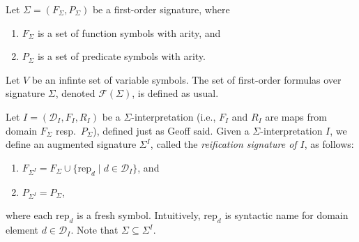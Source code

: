 \documentclass{article}
\begin{document}
Let $\Sigma = (F_\Sigma, P_\Sigma)$ be a first-order signature, where
\begin{enumerate}
  \item $F_\Sigma$ is a set of function symbols with arity, and
  \item $P_\Sigma$ is a set of predicate symbols with arity.
\end{enumerate}
Let $V$ be an infinte set of variable symbols.
The set of first-order formulas over signature $\Sigma$, denoted $\mathcal{F}(\Sigma)$, is defined as usual. 

Let $I = (\mathcal{D}_I, F_I, R_I)$ be a $\Sigma$-interpretation (i.e., $F_I$ and $R_I$ are maps from domain $F_\Sigma$ resp.\ $P_\Sigma$), defined just as Geoff said. 
Given a $\Sigma$-interpretation $I$, we define an augmented signature $\Sigma^I$, called the \emph{reification signature of $I$}, as follows:
\begin{enumerate}
  \item $F_{\Sigma^I} = F_\Sigma \cup \{ \mathrm{rep}_d \mid d \in \mathcal{D}_I \}$, and
  \item $P_{\Sigma^I} = P_\Sigma$,
\end{enumerate}
where each $\mathrm{rep}_d$ is a fresh symbol.
Intuitively, $\mathrm{rep}_d$ is syntactic name for domain element $d \in \mathcal{D}_I$. Note that $\Sigma \subseteq \Sigma^I$.
\end{document}
